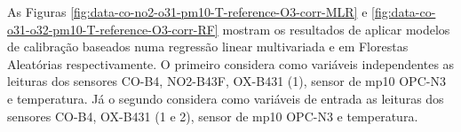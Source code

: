 As Figuras \ref{fig:data-co-no2-o31-pm10-T-reference-O3-corr-MLR} e \ref{fig:data-co-o31-o32-pm10-T-reference-O3-corr-RF} mostram os resultados de aplicar modelos de calibração baseados numa regressão linear multivariada e em Florestas Aleatórias respectivamente. O primeiro considera como variáveis independentes as leituras dos sensores CO-B4, NO2-B43F, OX-B431 (1), sensor de \acrshort{mp10} OPC-N3 e temperatura. Já o segundo considera como variáveis de entrada as leituras dos sensores CO-B4, OX-B431 (1 e 2), sensor de \acrshort{mp10} OPC-N3 e temperatura.